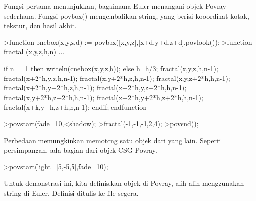 \documentclass{article}
\begin{document}
\begin{eulernotebook}
\begin{eulercomment}
\begin{eulercomment}
\begin{eulercomment}
Fungsi pertama menunjukkan, bagaimana Euler menangani objek Povray
sederhana. Fungsi povbox() mengembalikan string, yang berisi
kooordinat kotak, tekstur, dan hasil akhir.
\end{eulercomment}
\begin{eulerprompt}
>function onebox(x,y,z,d) := povbox([x,y,z],[x+d,y+d,z+d],povlook());
>function fractal (x,y,z,h,n) ...
\end{eulerprompt}
\begin{eulerudf}
   if n==1 then writeln(onebox(x,y,z,h));
   else
     h=h/3;
     fractal(x,y,z,h,n-1);
     fractal(x+2*h,y,z,h,n-1);
     fractal(x,y+2*h,z,h,n-1);
     fractal(x,y,z+2*h,h,n-1);
     fractal(x+2*h,y+2*h,z,h,n-1);
     fractal(x+2*h,y,z+2*h,h,n-1);
     fractal(x,y+2*h,z+2*h,h,n-1);
     fractal(x+2*h,y+2*h,z+2*h,h,n-1);
     fractal(x+h,y+h,z+h,h,n-1);
   endif;
  endfunction
\end{eulerudf}
\begin{eulerprompt}
>povstart(fade=10,<shadow);
>fractal(-1,-1,-1,2,4);
>povend();
\end{eulerprompt}
\begin{eulercomment}
Perbedaan memungkinkan memotong satu objek dari yang lain. Seperti
persimpangan, ada bagian dari objek CSG Povray.
\end{eulercomment}
\begin{eulerprompt}
>povstart(light=[5,-5,5],fade=10);
\end{eulerprompt}
\begin{eulercomment}
Untuk demonstrasi ini, kita definisikan objek di Povray, alih-alih
menggunakan string di Euler. Definisi ditulis ke file segera.


\end{eulercomment}
\end{eulercomment}
\end{eulercomment}
\end{eulernotebook}
\end{document}
